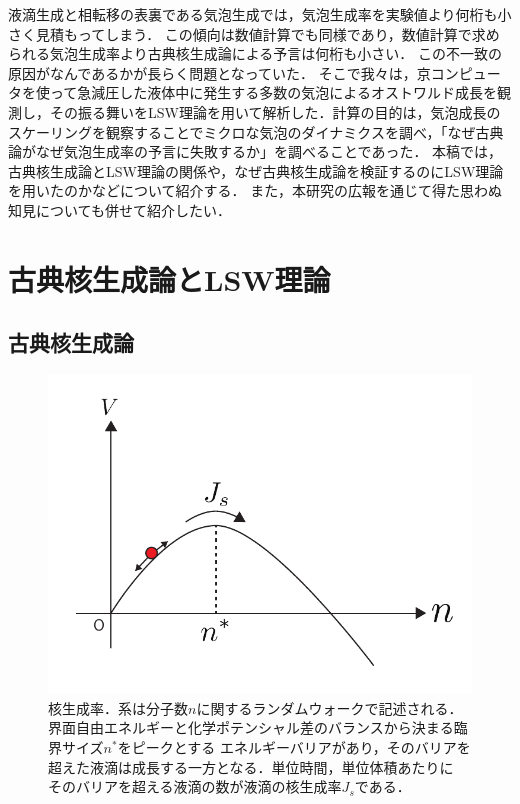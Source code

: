 \documentclass[topics,b5paper,papersize,twocolumn]{jsarticle}
\begin{document}
液滴生成と相転移の表裏である気泡生成では，気泡生成率を実験値より何桁も小さく見積もってしまう\cite{Vinogradov}．
この傾向は数値計算でも同様であり，数値計算で求められる気泡生成率より古典核生成論による予言は何桁も小さい\cite{Zeng, Yamamoto, wtime}．
この不一致の原因がなんであるかが長らく問題となっていた．
そこで我々は，京コンピュータを使って急減圧した液体中に発生する多数の気泡によるオストワルド成長を観測し，その振る舞いをLSW理論を用いて解析した．計算の目的は，気泡成長のスケーリングを観察することでミクロな気泡のダイナミクスを調べ，「なぜ古典論がなぜ気泡生成率の予言に失敗するか」を調べることであった．
本稿では，古典核生成論とLSW理論の関係や，なぜ古典核生成論を検証するのにLSW理論を用いたのかなどについて紹介する．
また，本研究の広報を通じて得た思わぬ知見についても併せて紹介したい．

\section{古典核生成論とLSW理論}

\subsection{古典核生成論}

\begin{figure}[tb]
\includegraphics[width=0.8\linewidth]{rw.pdf}
\caption{核生成率．系は分子数$n$に関するランダムウォークで記述される\cite{CNT}．
界面自由エネルギーと化学ポテンシャル差のバランスから決まる臨界サイズ$n^*$をピークとする
エネルギーバリアがあり，そのバリアを超えた液滴は成長する一方となる．単位時間，単位体積あたりに
そのバリアを超える液滴の数が液滴の核生成率$J_s$である．
}\label{fig_rw}
\end{figure}
\end{document}
